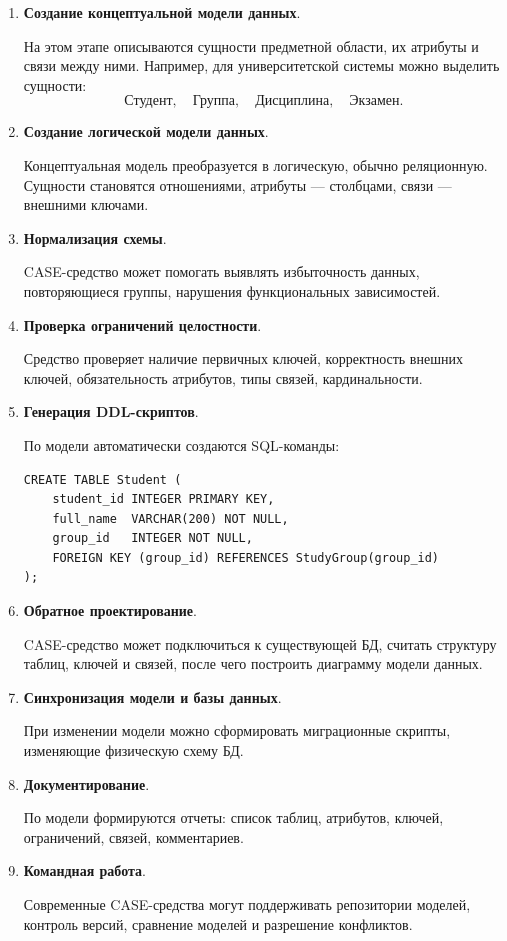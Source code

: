 \documentclass[12pt,a4paper]{article}
\theoremstyle{remark}
\begin{document}
\begin{enumerate}
    \item \textbf{Создание концептуальной модели данных}.

    На этом этапе описываются сущности предметной области, их атрибуты и связи между ними. Например, для университетской системы можно выделить сущности:
    \[
        \text{Студент}, \quad \text{Группа}, \quad \text{Дисциплина}, \quad \text{Экзамен}.
    \]

    \item \textbf{Создание логической модели данных}.

    Концептуальная модель преобразуется в логическую, обычно реляционную. Сущности становятся отношениями, атрибуты --- столбцами, связи --- внешними ключами.

    \item \textbf{Нормализация схемы}.

    CASE-средство может помогать выявлять избыточность данных, повторяющиеся группы, нарушения функциональных зависимостей.

    \item \textbf{Проверка ограничений целостности}.

    Средство проверяет наличие первичных ключей, корректность внешних ключей, обязательность атрибутов, типы связей, кардинальности.

    \item \textbf{Генерация DDL-скриптов}.

    По модели автоматически создаются SQL-команды:

\begin{verbatim}
CREATE TABLE Student (
    student_id INTEGER PRIMARY KEY,
    full_name  VARCHAR(200) NOT NULL,
    group_id   INTEGER NOT NULL,
    FOREIGN KEY (group_id) REFERENCES StudyGroup(group_id)
);
\end{verbatim}

    \item \textbf{Обратное проектирование}.

    CASE-средство может подключиться к существующей БД, считать структуру таблиц, ключей и связей, после чего построить диаграмму модели данных.

    \item \textbf{Синхронизация модели и базы данных}.

    При изменении модели можно сформировать миграционные скрипты, изменяющие физическую схему БД.

    \item \textbf{Документирование}.

    По модели формируются отчеты: список таблиц, атрибутов, ключей, ограничений, связей, комментариев.

    \item \textbf{Командная работа}.

    Современные CASE-средства могут поддерживать репозитории моделей, контроль версий, сравнение моделей и разрешение конфликтов.
\end{enumerate}
\end{document}
